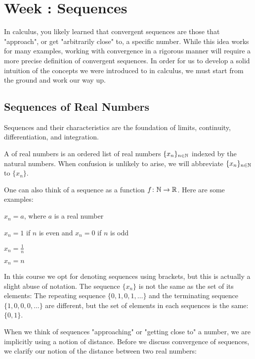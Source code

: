 \documentclass[../notes.tex]{subfiles}
\begin{document}
\section{Week \theweek: Sequences}

In calculus, you likely learned that convergent sequences are those that "approach", or get "arbitrarily close" to, a specific number. While this idea works for many examples, working with convergence in a rigorous manner will require a more precise definition of convergent sequences. In order for us to develop a solid intuition of the concepts we were introduced to in calculus, we must start from the ground and work our way up.

\subsection{Sequences of Real Numbers}

Sequences and their characteristics are the foundation of limits, continuity, differentiation, and integration. 

\begin{definition}[sequence]
\label{def:sequence}
    A  of real numbers is an ordered list of real numbers $\{x_n\}_{n\in\mathbb N}$ indexed by the natural numbers. When confusion is unlikely to arise, we will abbreviate $\{x_n\}_{n\in\mathbb N}$ to $\{x_n\}$.
\end{definition}
One can also think of a sequence as a function $f\colon \mathbb N\to \mathbb R$. Here are some examples:

\begin{example} 
\label{ex-sequences}
\phantom{ }
    \begin{listalph}
        \item $x_n=a$, where $a$ is a real number
        \item $x_n=1$ if $n$ is even and $x_n=0$ if $n$ is odd
        \item $x_n=\frac{1}{n}$
        \item $x_n=n$
    \end{listalph}
\end{example}

\begin{warn}
    In this course we opt for denoting sequences using brackets, but this is actually a slight abuse of notation. The sequence $\{x_n\}$ is not the same as the set of its elements: The repeating sequence $\{0,1,0,1,\dots\}$ and the terminating sequence $\{1,0,0,0,\dots\}$ are different, but the set of elements in each sequences is the same: $\{0,1\}$.
\end{warn}
When we think of sequences "approaching" or "getting close to" a number, we are implicitly using a notion of distance. Before we discuss convergence of sequences, we clarify our notion of the distance between two real numbers: 
\end{document}
